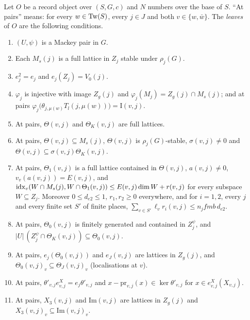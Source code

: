 \begin{definition}[Leaves]\label{pf:onto3:leaves}
Let $O$ be a record object over $(S,G,c)$ and $N$ numbers over the base of $S$. ``At pairs'' means: for every
$w\in\mathrm{Tw}(S)$, every $j\in J$ and both $v\in\{w,\bar w\}$. The \emph{leaves} of $O$ are the following
conditions.
\begin{enumerate}[label=(L\arabic*),leftmargin=*]
\item\label{pf:onto3:L:mackey} $(U,\psi)$ is a Mackey pair in $G$.
\item\label{pf:onto3:L:sup} Each $M_s(j)$ is a full lattice in $Z_j$ stable under $\rho_j(G)$.
\item\label{pf:onto3:L:proj} $e_j^2=e_j$ and $e_j(Z_j)=V_0(j)$.
\item\label{pf:onto3:L:coord} $\varphi_j$ is injective with image $Z_g(j)$ and $\varphi_j(M_j)=Z_g(j)\cap
M_s(j)$; and at pairs $\varphi_j\bigl(\theta_{j,\mu(w)}T_l(j,\mu(w))\bigr)=\mathrm{I}(v,j)$.
\item\label{pf:onto3:L:span} At pairs, $\Theta(v,j)$ and $\Theta_K(v,j)$ are full lattices.
\item\label{pf:onto3:L:lemS} At pairs, $\Theta(v,j)\subseteq M_s(j)$, $\Theta(v,j)$ is $\rho_j(G)$-stable,
$\sigma(v,j)\ne0$ and $\Theta(v,j)\subseteq\sigma(v,j)\Theta_K(v,j)$.
\item\label{pf:onto3:L:idx} At pairs, $\Theta_1(v,j)$ is a full lattice contained in $\Theta(v,j)$, $a(v,j)\ne0$,
$v_v(a(v,j))=E(v,j)$, and $\operatorname{idx}_v(W\cap M_s(j),W\cap\Theta_1(v,j))\le E(v,j)\dim W+r(v,j)$ for every
subspace $W\subseteq Z_j$. Moreover $0\le d_{e2}\le1$, $r_1,r_2\ge0$ everywhere, and for $i=1,2$, every $j$
and every finite set $S'$ of finite places, $\sum_{v\in S'}\ell_vr_i(v,j)\le n_jfmb\,d_{e2}$.
\item\label{pf:onto3:L:data} At pairs, $\Theta_0(v,j)$ is finitely generated and contained in $Z_j^\psi$, and
$|U|\,(Z_j^\psi\cap\Theta_K(v,j))\subseteq\Theta_0(v,j)$.
\item\label{pf:onto3:L:rank} At pairs, $e_j(\Theta_0(v,j))$ and $e_J(v,j)$ are lattices in $Z_g(j)$, and
$\Theta_0(v,j)_v\subseteq\Theta_J(v,j)_v$ (localisations at $v$).
\item\label{pf:onto3:L:ident} At pairs, $\theta'_{v,j}e^X_{v,j}=e_j\theta'_{v,j}$ and
$x-\mathrm{pr}_{v,j}(x)\in\ker\theta'_{v,j}$ for $x\in e^X_{v,j}(X_{v,j})$.
\item\label{pf:onto3:L:tw2} At pairs, $X_3(v,j)$ and $\mathrm{Im}(v,j)$ are lattices in $Z_g(j)$ and
$X_3(v,j)_v\subseteq\mathrm{Im}(v,j)_v$.

\end{enumerate}
\end{definition}
